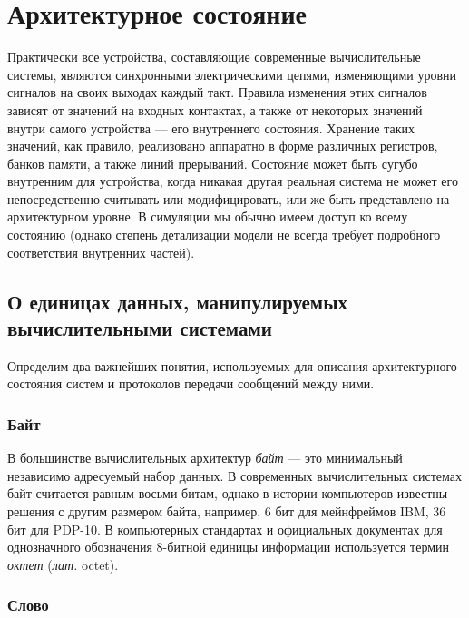 \chapter{Архитектурное состояние}\label{state}


Практически все устройства, составляющие современные вычислительные системы, являются синхронными электрическими цепями, изменяющими уровни сигналов на своих выходах каждый такт. Правила изменения этих сигналов зависят от значений на входных контактах, а также от некоторых значений внутри самого устройства --- его внутреннего состояния. Хранение таких значений, как правило, реализовано аппаратно в форме различных регистров, банков памяти, а также линий прерываний. Состояние может быть сугубо внутренним для устройства, когда никакая другая реальная система не может его непосредственно считывать или модифицировать, или же быть представлено на архитектурном уровне. В симуляции мы обычно имеем доступ ко всему состоянию (однако степень детализации модели не всегда требует подробного соответствия внутренних частей).

\section[О единицах данных]{О единицах данных, манипулируемых вычислительными системами}

Определим два важнейших понятия, используемых для описания архитектурного состояния систем и протоколов передачи сообщений между ними.

\subsection{Байт}
В большинстве вычислительных архитектур \textit{байт} --- это минимальный независимо адресуемый набор данных. В современных вычислительных системах байт считается равным восьми битам, однако в истории компьютеров известны решения с другим размером байта, например, 6 бит для мейнфреймов IBM, 36 бит для PDP-10. В компьютерных стандартах и официальных документах для однозначного обозначения 8-битной единицы информации используется термин \textit{октет} (\textit{лат.} octet).

\subsection{Слово}

